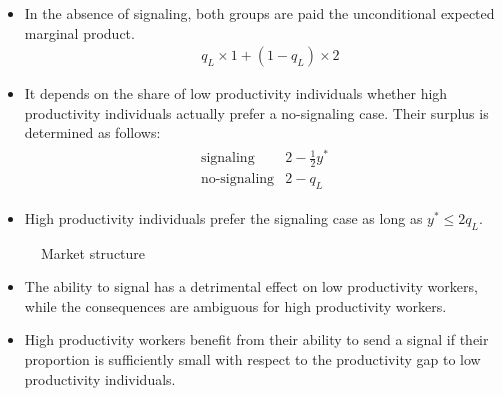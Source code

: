 \begin{frame}
\begin{itemize}\setlength\itemsep{1em}
\item In the absence of signaling, both groups are paid the unconditional expected marginal product.
	\begin{align*}
	   &  q_L\times 1 + (1 - q_L) \times 2
	\end{align*}
\end{itemize}
\end{frame}
\begin{frame}
\begin{itemize}\setlength\itemsep{1em}
\item It depends on the share of low productivity individuals whether high productivity individuals actually prefer a no-signaling case. Their surplus is determined as follows:
	\begin{align*}\begin{array}{ll}
	\text{signaling}    & 2 - \tfrac{1}{2} y^* \\
	\text{no-signaling} & 2 - q_L
	\end{array}\end{align*}
\item High productivity individuals prefer the signaling case as long as $y^* \leq 2 q_L$.
\end{itemize}
\end{frame}
\begin{frame}\begin{figure}[htp]\centering
\caption{Market structure}
\end{figure}\end{frame}
\begin{frame}
\begin{itemize}\setlength\itemsep{1em}
\item The ability to signal has a detrimental effect on low productivity workers, while the consequences are ambiguous for high productivity workers.

\item High productivity workers benefit from their ability to send a signal if their proportion is sufficiently small with respect to the productivity gap to low productivity individuals.
\end{itemize}
\end{frame}

